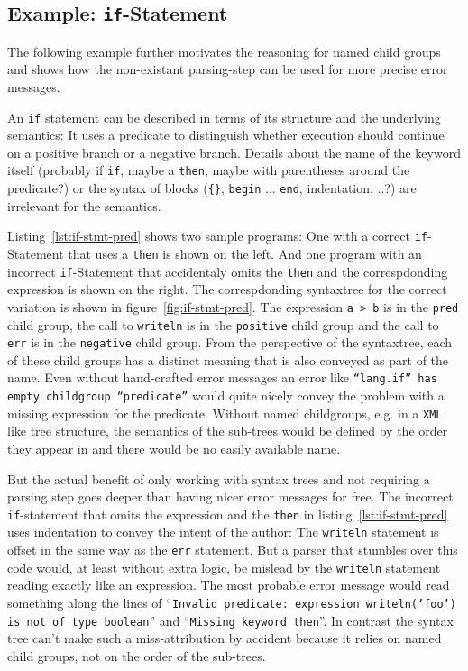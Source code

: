 \documentclass[sigconf,review=true]{acmart}
\begin{document}
\subsection{Example: \texttt{if}-Statement}

The following example further motivates the reasoning for named child groups and shows how the non-existant parsing-step can be used for more precise error messages.

An \texttt{if} statement can be described in terms of its structure and the underlying semantics: It uses a predicate to distinguish whether execution should continue on a positive branch or a negative branch. Details about the name of the keyword itself (probably if \texttt{if}, maybe a \texttt{then}, maybe with parentheses around the predicate?) or the syntax of blocks (\texttt{\{\}}, \texttt{begin} ... \texttt{end}, indentation, ..?) are irrelevant for the semantics.

Listing~\ref{lst:if-stmt-pred} shows two sample programs: One with a correct \texttt{if}-Statement that uses a \texttt{then} is shown on the left. And one program with an incorrect \texttt{if}-Statement that accidentaly omits the \texttt{then} and the correspdonding expression is shown on the right. The correspdonding syntaxtree for the correct variation is shown in figure~\ref{fig:if-stmt-pred}. The expression \texttt{a > b} is in the \texttt{pred} child group, the call to \texttt{writeln} is in the \texttt{positive} child group and the call to \texttt{err} is in the \texttt{negative} child group. From the perspective of the syntaxtree, each of these child groups has a distinct meaning that is also conveyed as part of the name. Even without hand-crafted error messages an error like \texttt{\enquote{lang.if} has empty childgroup \enquote{predicate}} would quite nicely convey the problem with a missing expression for the predicate. Without named childgroups, e.g. in a \texttt{XML} like tree structure, the semantics of the sub-trees would be defined by the order they appear in and there would be no easily available name.

But the actual benefit of only working with syntax trees and not requiring a parsing step goes deeper than having nicer error messages for free. The incorrect \texttt{if}-statement that omits the expression and the \texttt{then} in listing~\ref{lst:if-stmt-pred} uses indentation to convey the intent of the author: The \texttt{writeln} statement is offset in the same way as the \texttt{err} statement. But a parser that stumbles over this code would, at least without extra logic, be mislead by the \texttt{writeln} statement reading exactly like an expression. The most probable error message would read something along the lines of \enquote{\texttt{Invalid predicate: expression writeln('foo') is not of type boolean}} and \enquote{\texttt{Missing keyword then}}. In contrast the syntax tree can't make such a miss-attribution by accident because it relies on named child groups, not on the order of the sub-trees.
\end{document}
